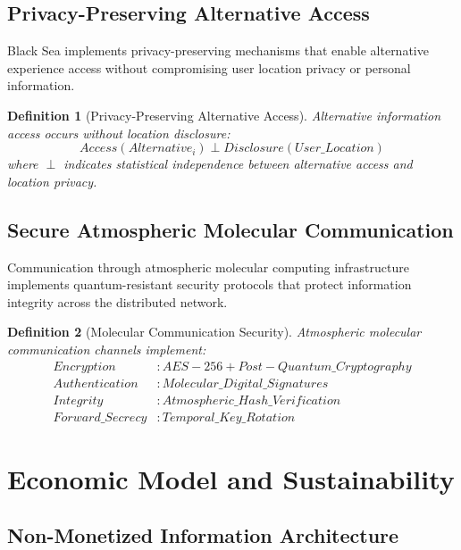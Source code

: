\documentclass[12pt,a4paper]{article}
\newtheorem{definition}{Definition}
\begin{document}
\subsection{Privacy-Preserving Alternative Access}

Black Sea implements privacy-preserving mechanisms that enable alternative experience access without compromising user location privacy or personal information.

\begin{definition}[Privacy-Preserving Alternative Access]
Alternative information access occurs without location disclosure:
\begin{equation}
Access(Alternative_i) \perp Disclosure(User\_Location)
\end{equation}
where $\perp$ indicates statistical independence between alternative access and location privacy.
\end{definition}

\subsection{Secure Atmospheric Molecular Communication}

Communication through atmospheric molecular computing infrastructure implements quantum-resistant security protocols that protect information integrity across the distributed network.

\begin{definition}[Molecular Communication Security]
Atmospheric molecular communication channels implement:
\begin{align}
Encryption &: AES-256 + Post-Quantum\_Cryptography \\
Authentication &: Molecular\_Digital\_Signatures \\
Integrity &: Atmospheric\_Hash\_Verification \\
Forward\_Secrecy &: Temporal\_Key\_Rotation
\end{align}
\end{definition}

\section{Economic Model and Sustainability}

\subsection{Non-Monetized Information Architecture}
\end{document}
